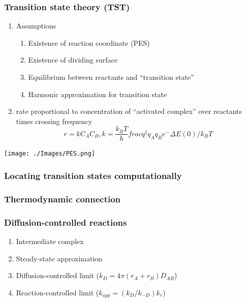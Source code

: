 \documentclass[11pt]{article}
\begin{document}
\subsubsection{Transition state theory (TST)}
\label{sec:org0c56637}
\begin{enumerate}
\item Assumptions
\begin{enumerate}
\item Existence of reaction coordinate (PES)
\item Existence of dividing surface
\item Equilibrium between reactants and ``transition state''
\item Harmonic approximation for transition state
\end{enumerate}
\item rate proportional to concentration of ``activated complex'' over reactants times crossing frequency
\begin{displaymath}
   r = k C_A C_B , k = \frac{k_B T}{h} frac{q^\ddagger}{q_A q_B}  e^-{\Delta E(0)/k_BT}
\end{displaymath}
\end{enumerate}

\begin{center}
\texttt{[image: ./Images/PES.png]}
\end{center}

\subsubsection{Locating transition states computationally}
\label{sec:org9e16b65}
\subsubsection{Thermodynamic connection}
\label{sec:org757506d}
\subsubsection{Diffusion-controlled reactions}
\label{sec:orga3c8555}
\begin{enumerate}
\item Intermediate complex
\item Steady-state approximation
\item Diffusion-controlled limit (\(k_D = 4\pi (r_A + r_B) D_{AB}\))
\item Reaction-controlled limit (\(k_{app}=(k_D/k_{-D})k_r\))
\end{enumerate}
\end{document}
